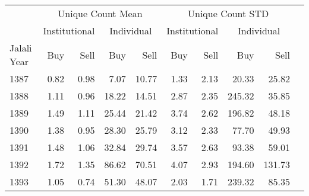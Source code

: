 \documentclass[border=0.2cm]{standalone}
\begin{document}
\begin{tabular}{lrrrrrrrrr}
                & \multicolumn{4}{c}{Unique Count Mean} & \multicolumn{4}{c}{Unique Count STD}                                                                                                        \\
    \cmidrule(l){2-5} \cmidrule(l){6-9}
                & \multicolumn{2}{c}{Institutional}     & \multicolumn{2}{c}{Individual}       & \multicolumn{2}{c}{Institutional} & \multicolumn{2}{c}{Individual}                                   \\
    \cmidrule(l){2-3} \cmidrule(l){4-5} \cmidrule(l){6-7}\cmidrule(l){8-9}
    Jalali Year & Buy                                   & Sell                                 & Buy                               & Sell                           & Buy  & Sell & Buy     & Sell    \\
    \toprule
    1387        & 0.82                                  & 0.98                                 & 7.07                              & 10.77                          & 1.33 & 2.13 & 20.33   & 25.82   \\
    1388        & 1.11                                  & 0.96                                 & 18.22                             & 14.51                          & 2.87 & 2.35 & 245.32  & 35.85   \\
    1389        & 1.49                                  & 1.11                                 & 25.44                             & 21.42                          & 3.74 & 2.62 & 196.82  & 48.18   \\
    1390        & 1.38                                  & 0.95                                 & 28.30                             & 25.79                          & 3.12 & 2.33 & 77.70   & 49.93   \\
    1391        & 1.48                                  & 1.06                                 & 32.84                             & 29.74                          & 3.57 & 2.63 & 93.38   & 59.01   \\
    1392        & 1.72                                  & 1.35                                 & 86.62                             & 70.51                          & 4.07 & 2.93 & 194.60  & 131.73  \\
    1393        & 1.05                                  & 0.74                                 & 51.30                             & 48.07                          & 2.03 & 1.71 & 239.32  & 85.35   \\

\end{tabular}
\end{document}
